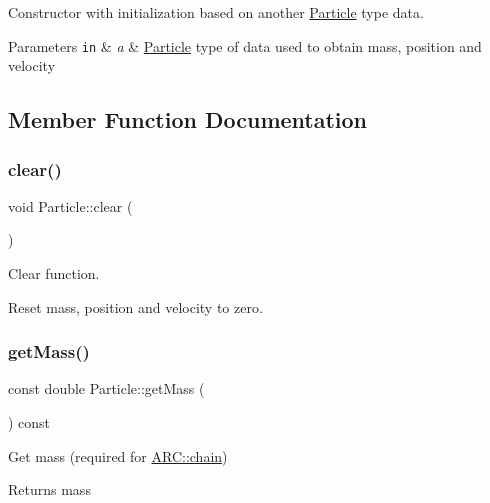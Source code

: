Constructor with initialization based on another \hyperlink{classParticle}{Particle} type data. 


\begin{DoxyParams}[1]{Parameters}
\mbox{\tt in}  & {\em a} & \hyperlink{classParticle}{Particle} type of data used to obtain mass, position and velocity \\
\hline
\end{DoxyParams}


\subsection{Member Function Documentation}
\hypertarget{classParticle_ab0eea4368ee797652c528949ab4ac563}{}\label{classParticle_ab0eea4368ee797652c528949ab4ac563} 
\subsubsection{\texorpdfstring{clear()}{clear()}}
{\footnotesize\ttfamily void Particle\+::clear (\begin{DoxyParamCaption}{ }\end{DoxyParamCaption})\hspace{0.3cm}{\ttfamily [inline]}}



Clear function. 

Reset mass, position and velocity to zero. \hypertarget{classParticle_a2576aff503f68e78ced91406512b1255}{}\label{classParticle_a2576aff503f68e78ced91406512b1255} 
\subsubsection{\texorpdfstring{get\+Mass()}{getMass()}}
{\footnotesize\ttfamily const double Particle\+::get\+Mass (\begin{DoxyParamCaption}{ }\end{DoxyParamCaption}) const\hspace{0.3cm}{\ttfamily [inline]}}



Get mass (required for \hyperlink{classARC_1_1chain}{A\+R\+C\+::chain}) 

\begin{DoxyReturn}{Returns}
mass 
\end{DoxyReturn}
\hypertarget{classParticle_a4ec76421cddd91b1f27357fb182f6923}{}\label{classParticle_a4ec76421cddd91b1f27357fb182f6923} 
